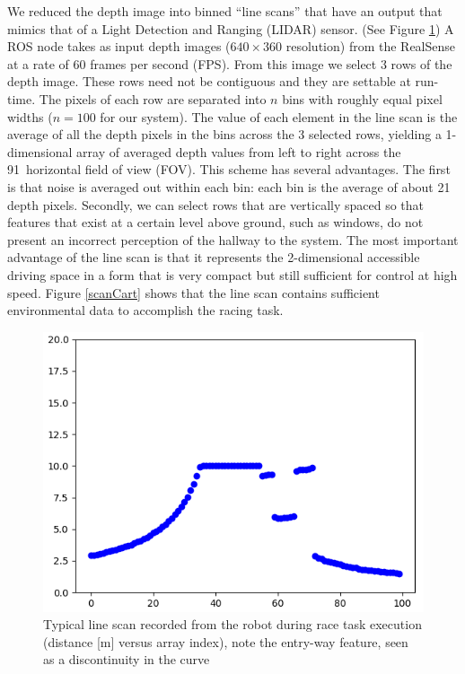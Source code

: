 \documentclass[letterpaper, 10 pt, conference]{ieeeconf}  %
\begin{document}
We reduced the depth image into binned ``line scans'' that have an output that mimics that of a Light Detection and Ranging (LIDAR) sensor.  (See Figure \ref{scanArr})  A ROS node takes as input depth images ($640 \times 360$ resolution) from the RealSense at a rate of 60 frames per second (FPS).  From this image we select 3 rows of the depth image.  These rows need not be contiguous and they are settable at run-time.  The pixels of each row are separated into $n$ bins with roughly equal pixel widths ($n=100$ for our system).  The value of each element in the line scan is the average of all the depth pixels in the bins across the 3 selected rows, yielding a 1-dimensional array of averaged depth values from left to right across the 91\textdegree \ horizontal field of view (FOV). This scheme has several advantages.  The first is that noise is averaged out within each bin: each bin is the average of about 21 depth pixels.   Secondly, we can select rows that are vertically spaced so that features that exist at a certain level above ground, such as windows, do not present an incorrect perception of the hallway to the system.  The most important advantage of the line scan is that it represents the 2-dimensional accessible driving space in a form that is very compact but still sufficient for control at high speed.  Figure \ref{scanCart} shows that the line scan contains sufficient environmental data to accomplish the racing task.

\begin{figure}[t]
    \centering
    \includegraphics[width=\columnwidth]{Figures/scanArr.png}
    \caption{Typical line scan recorded from the robot during race task execution (distance [m] versus array index), note the entry-way feature, seen as a discontinuity in the curve}
    \label{scanArr}
\end{figure}
\end{document}
